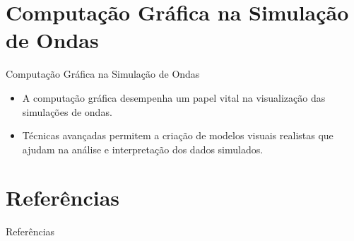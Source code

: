 \documentclass[aspectratio=169,xcolor=table]{beamer}
\begin{document}
\section{Computação Gráfica na Simulação de Ondas}
\begin{frame}{Computação Gráfica na Simulação de Ondas}
    \begin{itemize}
        \item A computação gráfica desempenha um papel vital na visualização das simulações de ondas.
        \item Técnicas avançadas permitem a criação de modelos visuais realistas que ajudam na análise e interpretação dos dados simulados.
    \end{itemize}
\end{frame}

\section{Referências}
\begin{frame}[allowframebreaks]{Referências}
    
    
\end{frame}
\end{document}
